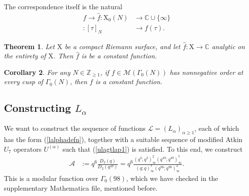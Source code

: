 \documentclass[reqno]{amsart}
\newtheorem{theorem}{Theorem}[section]
\newtheorem{corollary}[theorem]{Corollary}
\theoremstyle{definition}
\theoremstyle{remark}
\numberwithin{equation}{section}
\begin{document}
The correspondence itself is the natural
\begin{align*}
f\longrightarrow\hat{f}:\mathrm{X}_0(N)&\longrightarrow\mathbb{C}\cup\{\infty\}\\
:[\tau]_N&\longrightarrow f(\tau).
\end{align*}  
\begin{theorem}\label{riemannsurfacetheorema}
Let $\mathrm{X}$ be a compact Riemann surface, and let $\hat{f}:\mathrm{X}\longrightarrow\mathbb{C}$ analytic on the entirety of $\mathrm{X}$.  Then $\hat{f}$ is be a constant function.
\end{theorem}

\begin{corollary}
For any $N\in\mathbb{Z}_{\ge 1}$, if $f\in\mathcal{M}\left(\Gamma_0(N)\right)$ has nonnegative order at every cusp of $\Gamma_0(N)$, then $f$ is a constant function. 
\end{corollary}

\subsection{Constructing $L_{\alpha}$}

We want to construct the sequence of functions $\mathcal{L}=\left(L_{\alpha}\right)_{\alpha\ge 1}$, each of which has the form (\ref{lalphadefn}), together with a suitable sequence of modified Atkin $U_7$ operators $U^{(\alpha)}$ such that (\ref{ulagtlap1}) is satisfied.  To this end, we construct
\begin{align*}
\mathcal{A} &:= q^6\frac{D_2(q)}{D_2(q^{49})} = q^6\frac{(q^2;q^2)^2_{\infty}(q^{49};q^{49})^{7}_{\infty}}{(q;q)^{7}_{\infty}(q^{98};q^{98})^2_{\infty}}.
\end{align*}  This is a modular function over $\Gamma_0(98)$, which we have checked in the supplementary Mathematica file, mentioned before. 
\end{document}
